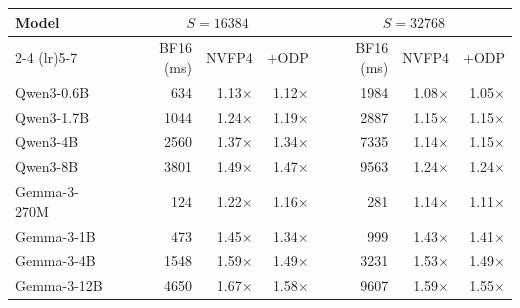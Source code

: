 \begin{tabular}{lrrrrrr}
\toprule
\multirow{2}{*}{Model} & \multicolumn{3}{c}{$S{=}16384$} & \multicolumn{3}{c}{$S{=}32768$} \\
\cmidrule(lr){2-4} \cmidrule(lr){5-7}
 & BF16 (ms) & NVFP4 & +ODP & BF16 (ms) & NVFP4 & +ODP \\
\midrule
Qwen3-0.6B & 634 & 1.13$\times$ & 1.12$\times$ & 1984 & 1.08$\times$ & 1.05$\times$ \\
Qwen3-1.7B & 1044 & 1.24$\times$ & 1.19$\times$ & 2887 & 1.15$\times$ & 1.15$\times$ \\
Qwen3-4B & 2560 & 1.37$\times$ & 1.34$\times$ & 7335 & 1.14$\times$ & 1.15$\times$ \\
Qwen3-8B & 3801 & 1.49$\times$ & 1.47$\times$ & 9563 & 1.24$\times$ & 1.24$\times$ \\
\midrule
Gemma-3-270M & 124 & 1.22$\times$ & 1.16$\times$ & 281 & 1.14$\times$ & 1.11$\times$ \\
Gemma-3-1B & 473 & 1.45$\times$ & 1.34$\times$ & 999 & 1.43$\times$ & 1.41$\times$ \\
Gemma-3-4B & 1548 & 1.59$\times$ & 1.49$\times$ & 3231 & 1.53$\times$ & 1.49$\times$ \\
Gemma-3-12B & 4650 & 1.67$\times$ & 1.58$\times$ & 9607 & 1.59$\times$ & 1.55$\times$ \\
\bottomrule
\end{tabular}

